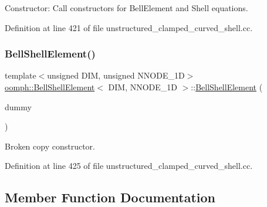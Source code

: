 Constructor\+: Call constructors for Bell\+Element and Shell equations. 



Definition at line 421 of file unstructured\+\_\+clamped\+\_\+curved\+\_\+shell.\+cc.

\mbox{\label{classoomph_1_1BellShellElement_a9a3476e77088236068b559a7021a899d}} 
\subsubsection{\texorpdfstring{Bell\+Shell\+Element()}{BellShellElement()}\hspace{0.1cm}{\footnotesize\ttfamily [2/2]}}
{\footnotesize\ttfamily template$<$unsigned D\+IM, unsigned N\+N\+O\+D\+E\+\_\+1D$>$ \\
\hyperlink{classoomph_1_1BellShellElement}{oomph\+::\+Bell\+Shell\+Element}$<$ D\+IM, N\+N\+O\+D\+E\+\_\+1D $>$\+::\hyperlink{classoomph_1_1BellShellElement}{Bell\+Shell\+Element} (\begin{DoxyParamCaption}\item[{const \hyperlink{classoomph_1_1BellShellElement}{Bell\+Shell\+Element}$<$ D\+IM, N\+N\+O\+D\+E\+\_\+1D $>$ \&}]{dummy }\end{DoxyParamCaption})\hspace{0.3cm}{\ttfamily [inline]}}



Broken copy constructor. 



Definition at line 425 of file unstructured\+\_\+clamped\+\_\+curved\+\_\+shell.\+cc.



\subsection{Member Function Documentation}
\mbox{\label{classoomph_1_1BellShellElement_a00932feabc5283a7edbff0cf8c52eb67}} 
